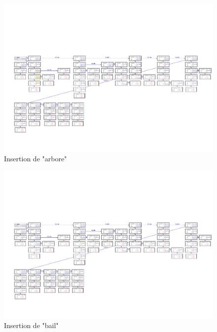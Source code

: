 	\begin{figure}[H]
		\centering \includegraphics[angle=90,scale=0.82,trim=1cm 0cm 0cm 5cm,clip=true]{../tests/ddd_insertion_arbore}
		\caption{Insertion de "arbore"}
	\end{figure}
	\begin{figure}[H]
		\centering \includegraphics[angle=90,scale=0.82,trim=1cm 0cm 0cm 5cm,clip=true]{../tests/ddd_insertion_bail}
		\caption{Insertion de "bail"}
	\end{figure}
